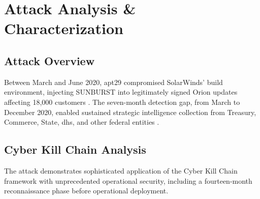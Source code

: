 \section{Attack Analysis \& Characterization}
\label{sec:attack_analysis}

\subsection{Attack Overview}
Between March and June 2020, \gls{apt}29 compromised SolarWinds' build environment, injecting SUNBURST into legitimately signed Orion updates affecting 18,000 customers \cite{agency_russian_2021, mandiant_highly_2020, nagle_solarwinds_2023}. The seven-month detection gap, from March to December 2020, enabled sustained strategic intelligence collection from Treasury, Commerce, State, \gls{dhs}, and other federal entities \cite{us_open_2021}.

\subsection{Cyber Kill Chain Analysis}
The attack demonstrates sophisticated application of the Cyber Kill Chain framework \cite{hutchins_intelligencedriven_2011} with unprecedented operational security, including a fourteen-month reconnaissance phase before operational deployment.


